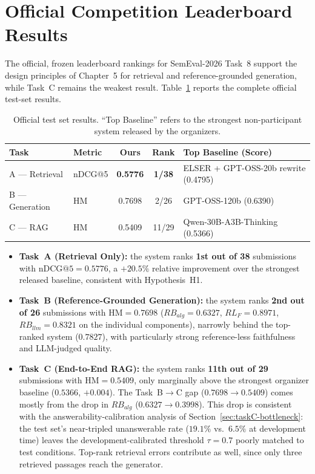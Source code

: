 \section{Official Competition Leaderboard Results}
\label{sec:leaderboard}

The official, frozen leaderboard rankings for SemEval-2026 Task~8 support the design principles of Chapter~5 for retrieval and reference-grounded generation, while Task~C remains the weakest result. Table~\ref{tab:leaderboard-en} reports the complete official test-set results.

\begin{table}[h]
\centering
\small
\begin{tabular}{llccl}
\toprule
\textbf{Task} & \textbf{Metric} & \textbf{Ours} & \textbf{Rank} & \textbf{Top Baseline (Score)} \\
\midrule
A --- Retrieval & nDCG@5 & \textbf{0.5776} & \textbf{1/38} & ELSER + GPT-OSS-20b rewrite (0.4795) \\
B --- Generation & HM & 0.7698 & 2/26 & GPT-OSS-120b (0.6390) \\
C --- RAG & HM & 0.5409 & 11/29 & Qwen-30B-A3B-Thinking (0.5366) \\
\bottomrule
\end{tabular}
\caption{Official test set results. ``Top Baseline'' refers to the strongest non-participant system released by the organizers.}
\label{tab:leaderboard-en}
\end{table}

\begin{itemize}
    \item \textbf{Task~A (Retrieval Only):} the system ranks \textbf{1st out of 38} submissions with $\text{nDCG@5}{=}0.5776$, a $+20.5\%$ relative improvement over the strongest released baseline, consistent with Hypothesis~H1.
    \item \textbf{Task~B (Reference-Grounded Generation):} the system ranks \textbf{2nd out of 26} submissions with $\text{HM}{=}0.7698$ ($RB_{alg}{=}0.6327$, $RL_F{=}0.8971$, $RB_{llm}{=}0.8321$ on the individual components), narrowly behind the top-ranked system ($0.7827$), with particularly strong reference-less faithfulness and LLM-judged quality.
    \item \textbf{Task~C (End-to-End RAG):} the system ranks \textbf{11th out of 29} submissions with $\text{HM}{=}0.5409$, only marginally above the strongest organizer baseline ($0.5366$, $+0.004$). The Task~B$\rightarrow$C gap ($0.7698 \rightarrow 0.5409$) comes mostly from the drop in $RB_{alg}$ ($0.6327 \rightarrow 0.3998$). This drop is consistent with the answerability-calibration analysis of Section~\ref{sec:taskC-bottleneck}: the test set's near-tripled unanswerable rate ($19.1\%$ vs.\ $6.5\%$ at development time) leaves the development-calibrated threshold $\tau{=}0.7$ poorly matched to test conditions. Top-rank retrieval errors contribute as well, since only three retrieved passages reach the generator.
\end{itemize}

